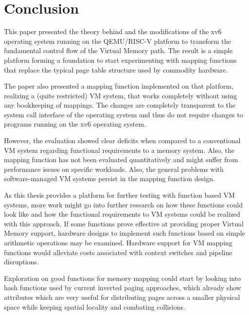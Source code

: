 \chapter{Conclusion}

\label{chap:conclusion}



This paper presented the theory behind and the modifications of the xv6 operating system running on the QEMU/RISC-V platform to transform the fundamental control flow of the Virtual Memory path. The result is a simple platform forming a foundation to start experimenting with mapping functions that replace the typical page table structure used by commodity hardware.

The paper also presented a mapping function implemented on that platform, realizing a (quite restricted) VM system, that works completely without using any bookkeeping of mappings. The changes are completely transparent to the system call interface of the operating system and thus do not require changes to programs running on the xv6 operating system.

However, the evaluation showed clear deficits when compared to a conventional VM system regarding functional requirements to a memory system. Also, the mapping function has not been evaluated quantitatively and might suffer from performance issues on specific workloads. Also, the general problems with software-managed VM systems persist in the mapping function design.

As this thesis provides a platform for further testing with function based VM systems, more work might go into further research on how these functions could look like and how the functional requirements to VM systems could be realized with this approach. If some functions prove effective at providing proper Virtual Memory support, hardware designs to implement such functions based on simple arithmetic operations may be examined. Hardware support for VM mapping functions would alleviate costs associated with context switches and pipeline disruptions.

Exploration on good functions for memory mapping could start by looking into hash functions used by current inverted paging approaches, which already show attributes which are very useful for distributing pages across a smaller physical space while keeping spatial locality and combating collisions.
